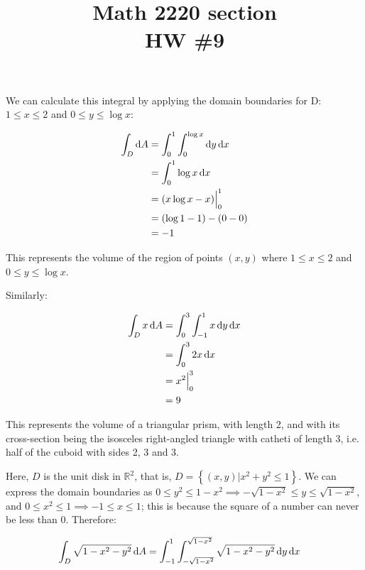 
\newcommand{\hwnumber}{9}

\title{Math 2220 section \sectionnum\\ HW \#\hwnumber}
\author{\name}
\maketitle



We can calculate this integral by applying the domain boundaries for D: $1 \leq x \leq 2$ and $0 \leq y \leq \log x$:

\begin{align*}
  \int_D \mathop{}\!\mathrm{d} A &= \int_0^1 \int_0^{\log x} \mathop{}\!\mathrm{d} y \mathop{}\!\mathrm{d} x \\
  &= \int_0^1 \log x \mathop{}\!\mathrm{d} x \\
  &= (x \log x - x) \Big|_0^1 \\
  &= (\log 1 - 1) - (0 - 0) \\
  &= -1
\end{align*}

This represents the volume of the region of points $(x, y)$ where $1 \leq x \leq 2$ and $0 \leq y \leq \log x$.

Similarly:

\begin{align*}
  \int_D x \mathop{}\!\mathrm{d} A &= \int_0^3 \int_{-1}^1 x \mathop{}\!\mathrm{d} y \mathop{}\!\mathrm{d} x \\
  &= \int_0^3 2x \mathop{}\!\mathrm{d} x \\
  &= x^2 \Big|_0^3 \\
  &= 9
\end{align*}

This represents the volume of a triangular prism, with length 2, and with its cross-section being the isosceles right-angled triangle with catheti of length 3, i.e. half of the cuboid with sides 2, 3 and 3.

Here, $D$ is the unit disk in $\mathbb{R}^2$, that is, $D = \left\{(x, y) | x^2 + y^2 \leq 1\right\}$. We can express the domain boundaries as $0 \leq y^2 \leq 1 - x^2 \implies -\sqrt{1 - x^2} \leq y \leq \sqrt{1 - x^2}$, and $0 \leq x^2 \leq 1 \implies -1 \leq x \leq 1$; this is because the square of a number can never be less than $0$. Therefore:

\begin{align*}
  \int_D \sqrt{1 - x^2 - y^2} \mathop{}\!\mathrm{d} A &= \int_{-1}^1 \int_{-\sqrt{1 - x^2}}^{\sqrt{1 - x^2}} \sqrt{1 - x^2 - y^2} \mathop{}\!\mathrm{d} y \mathop{}\!\mathrm{d} x
\end{align*}

